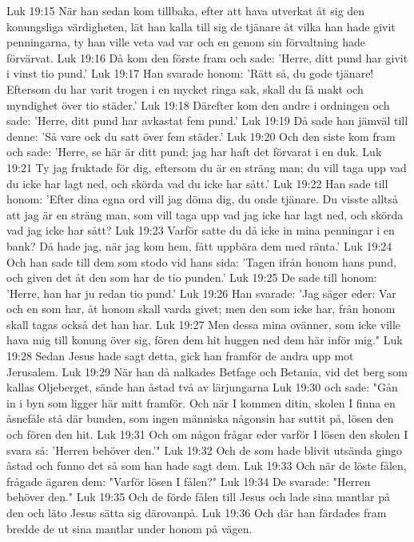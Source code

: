 Luk 19:15  När han sedan kom tillbaka, efter att hava utverkat åt sig den konungsliga värdigheten, lät han kalla till sig de tjänare åt vilka han hade givit penningarna, ty han ville veta vad var och en genom sin förvaltning hade förvärvat.
Luk 19:16  Då kom den förste fram och sade: 'Herre, ditt pund har givit i vinst tio pund.'
Luk 19:17  Han svarade honom: 'Rätt så, du gode tjänare! Eftersom du har varit trogen i en mycket ringa sak, skall du få makt och myndighet över tio städer.'
Luk 19:18  Därefter kom den andre i ordningen och sade: 'Herre, ditt pund har avkastat fem pund.'
Luk 19:19  Då sade han jämväl till denne: 'Så vare ock du satt över fem städer.'
Luk 19:20  Och den siste kom fram och sade: 'Herre, se här är ditt pund; jag har haft det förvarat i en duk.
Luk 19:21  Ty jag fruktade för dig, eftersom du är en sträng man; du vill taga upp vad du icke har lagt ned, och skörda vad du icke har sått.'
Luk 19:22  Han sade till honom: 'Efter dina egna ord vill jag döma dig, du onde tjänare. Du visste alltså att jag är en sträng man, som vill taga upp vad jag icke har lagt ned, och skörda vad jag icke har sått?
Luk 19:23  Varför satte du då icke in mina penningar i en bank? Då hade jag, när jag kom hem, fått uppbära dem med ränta.'
Luk 19:24  Och han sade till dem som stodo vid hans sida: 'Tagen ifrån honom hans pund, och given det åt den som har de tio punden.'
Luk 19:25  De sade till honom: 'Herre, han har ju redan tio pund.'
Luk 19:26  Han svarade: 'Jag säger eder: Var och en som har, åt honom skall varda givet; men den som icke har, från honom skall tagas också det han har.
Luk 19:27  Men dessa mina ovänner, som icke ville hava mig till konung över sig, fören dem hit huggen ned dem här inför mig."
Luk 19:28  Sedan Jesus hade sagt detta, gick han framför de andra upp mot Jerusalem.
Luk 19:29  När han då nalkades Betfage och Betania, vid det berg som kallas Oljeberget, sände han åstad två av lärjungarna
Luk 19:30  och sade: "Gån in i byn som ligger här mitt framför. Och när I kommen ditin, skolen I finna en åsnefåle stå där bunden, som ingen människa någonsin har suttit på, lösen den och fören den hit.
Luk 19:31  Och om någon frågar eder varför I lösen den skolen I svara så: 'Herren behöver den.'"
Luk 19:32  Och de som hade blivit utsända gingo åstad och funno det så som han hade sagt dem.
Luk 19:33  Och när de löste fålen, frågade ägaren dem: "Varför lösen I fålen?"
Luk 19:34  De svarade: "Herren behöver den."
Luk 19:35  Och de förde fålen till Jesus och lade sina mantlar på den och läto Jesus sätta sig därovanpå.
Luk 19:36  Och där han färdades fram bredde de ut sina mantlar under honom på vägen.
